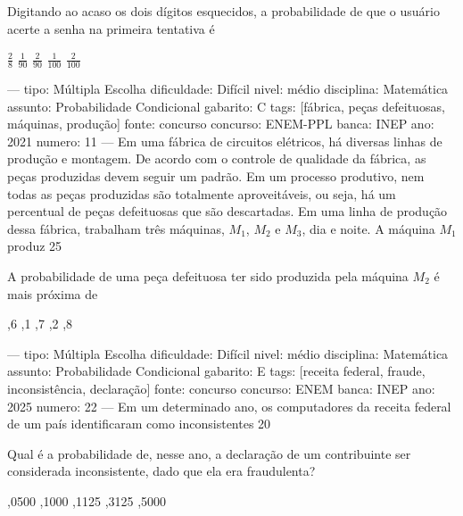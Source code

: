 Digitando ao acaso os dois dígitos esquecidos, a probabilidade de que o usuário acerte a senha na primeira tentativa é
\begin{choices}
\choice \( \frac{2}{8} \)
\choice \( \frac{1}{90} \)
\choice \( \frac{2}{90} \)
\choice \( \frac{1}{100} \)
\correctchoice \( \frac{2}{100} \)
\end{choices}

---
tipo: Múltipla Escolha
dificuldade: Difícil
nivel: médio
disciplina: Matemática
assunto: Probabilidade Condicional
gabarito: C
tags: [fábrica, peças defeituosas, máquinas, produção]
fonte: concurso
concurso: ENEM-PPL
banca: INEP
ano: 2021
numero: 11
---
\question
Em uma fábrica de circuitos elétricos, há diversas linhas de produção e montagem. De acordo com o controle de qualidade da fábrica, as peças produzidas devem seguir um padrão. Em um processo produtivo, nem todas as peças produzidas são totalmente aproveitáveis, ou seja, há um percentual de peças defeituosas que são descartadas. Em uma linha de produção dessa fábrica, trabalham três máquinas, \( M_1 \), \( M_2 \) e \( M_3 \), dia e noite. A máquina \( M_1 \) produz 25%

A probabilidade de uma peça defeituosa ter sido produzida pela máquina \( M_2 \) é mais próxima de
\begin{oneparchoices}
,6%
,1%
,7%
,2%
,8%
\end{oneparchoices}

---
tipo: Múltipla Escolha
dificuldade: Difícil
nivel: médio
disciplina: Matemática
assunto: Probabilidade Condicional
gabarito: E
tags: [receita federal, fraude, inconsistência, declaração]
fonte: concurso
concurso: ENEM
banca: INEP
ano: 2025
numero: 22
---
\question
Em um determinado ano, os computadores da receita federal de um país identificaram como inconsistentes 20%

Qual é a probabilidade de, nesse ano, a declaração de um contribuinte ser considerada inconsistente, dado que ela era fraudulenta?
\begin{oneparchoices}
,0500
,1000
,1125
,3125
,5000
\end{oneparchoices}

